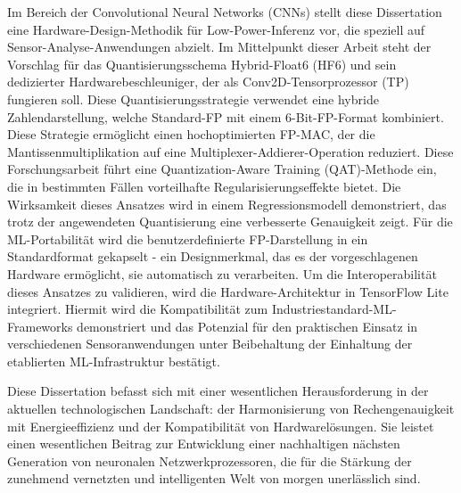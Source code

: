 Im Bereich der Convolutional Neural Networks (CNNs) stellt diese Dissertation eine Hardware-Design-Methodik f\"ur Low-Power-Inferenz vor, die speziell auf Sensor-Analyse-Anwendungen abzielt. Im Mittelpunkt dieser Arbeit steht der Vorschlag f\"ur das Quantisierungsschema Hybrid-Float6 (HF6) und sein dedizierter Hardwarebeschleuniger, der als Conv2D-Tensorprozessor (TP) fungieren soll. Diese Quantisierungsstrategie verwendet eine hybride Zahlendarstellung, welche Standard-FP mit einem 6-Bit-FP-Format kombiniert. Diese Strategie erm\"oglicht einen hochoptimierten FP-MAC, der die Mantissenmultiplikation auf eine Multiplexer-Addierer-Operation reduziert. Diese Forschungsarbeit f\"uhrt eine Quantization-Aware Training (QAT)-Methode ein, die in bestimmten F\"allen vorteilhafte Regularisierungseffekte bietet. Die Wirksamkeit dieses Ansatzes wird in einem Regressionsmodell demonstriert, das trotz der angewendeten Quantisierung eine verbesserte Genauigkeit zeigt. F\"ur die ML-Portabilit\"at wird die benutzerdefinierte FP-Darstellung in ein Standardformat gekapselt - ein Designmerkmal, das es der vorgeschlagenen Hardware erm\"oglicht, sie automatisch zu verarbeiten. Um die Interoperabilit\"at dieses Ansatzes zu validieren, wird die Hardware-Architektur in TensorFlow Lite integriert. Hiermit wird die Kompatibilit\"at zum Industriestandard-ML-Frameworks demonstriert und das Potenzial f\"ur den praktischen Einsatz in verschiedenen Sensoranwendungen unter Beibehaltung der Einhaltung der etablierten ML-Infrastruktur best\"atigt.

Diese Dissertation befasst sich mit einer wesentlichen Herausforderung in der aktuellen technologischen Landschaft: der Harmonisierung von Rechengenauigkeit mit Energieeffizienz und der Kompatibilit\"at von Hardwarel\"osungen. Sie leistet einen wesentlichen Beitrag zur Entwicklung einer nachhaltigen n\"achsten Generation von neuronalen Netzwerkprozessoren, die f\"ur die St\"arkung der zunehmend vernetzten und intelligenten Welt von morgen unerl\"asslich sind.
